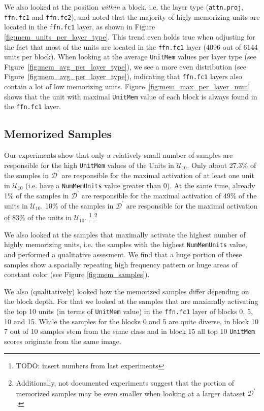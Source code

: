 \documentclass{article} %
\begin{document}
We also looked at the position \textit{within} a block, i.e. the layer type (\texttt{attn.proj}, \texttt{ffn.fc1} and \texttt{ffn.fc2}), and noted that the majority of higly memorizing units are located in the \texttt{ffn.fc1} layer, as shown in Figure \ref{fig:mem_units_per_layer_type}.
This trend even holds true when adjusting for the fact that most of the units are located in the \texttt{ffn.fc1} layer (4096 out of 6144 units per block).
When looking at the average \texttt{UnitMem} values per layer type (see Figure~\ref{fig:mem_avg_per_layer_type}), we see a more even distribution (see Figure~\ref{fig:mem_avg_per_layer_type}), indicating that \texttt{ffn.fc1} layers also contain a lot of low memorizing units.
Figure~\ref{fig:mem_max_per_layer_num} shows that the unit with maximal \texttt{UnitMem} value of each block is always found in the \texttt{ffn.fc1} layer.

\subsection{Memorized Samples}
Our experiments show that only a relatively small number of samples are responsible for the high \texttt{UnitMem} values of the Units in $\mathcal{U}_{10}$.
Only about 27.3\% of the samples in $\mathcal{D}^\prime$ are responsible for the maximal activation of at least one unit in $\mathcal{U}_{10}$ (i.e. have a \texttt{NumMemUnits} value greater than 0).
At the same time, already 1\% of the samples in $\mathcal{D}^\prime$ are responsible for the maximal activation of 49\% of the units in $\mathcal{U}_{10}$.
10\% of the samples in $\mathcal{D}^\prime$ are responsible for the maximal activation of 83\% of the units in $\mathcal{U}_{10}$.
\footnote{TODO: insert numbers from last experiments}
\footnote{Additionally, not documented experiments suggest that the portion of memorized samples may be even smaller when looking at a larger dataset $\mathcal{D}^\prime$.}

We also looked at the samples that maximally activate the highest number of highly memorizing units, i.e. the samples with the highest \texttt{NumMemUnits} value, and performed a qualitative assesment.
We find that a huge portion of these samples show a spacially repeating high frequency pattern or huge areas of constant color (see Figure \ref{fig:mem_samples}).

We also (qualitatively) looked how the memorized samples differ depending on the block depth.
For that we looked at the samples that are maximally activating the top 10 units (in terms of \texttt{UnitMem} value) in the \texttt{ffn.fc1} layer of blocks 0, 5, 10 and 15.
While the samples for the blocks 0 and 5 are quite diverse, in block 10 7 out of 10 samples stem from the same class and in block 15 all top 10 \texttt{UnitMem} scores originate from the same image.
\end{document}
